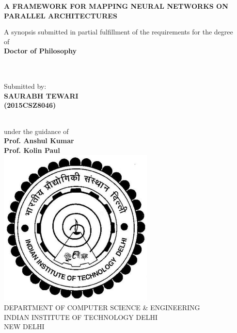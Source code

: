 \documentclass[a4paper,10pt]{article}
\begin{document}
	
\begin{titlepage}
	
	\begin{center}
		
		\vspace{4cm}
		\LARGE \textbf{A FRAMEWORK FOR MAPPING NEURAL NETWORKS ON PARALLEL ARCHITECTURES}\\
		
		\vspace{2cm}
		
		\large {A synopsis submitted in partial fulfillment of the requirements for the degree\ \\}
		\vspace{0.5cm}
		\large {of\ \\}
		\vspace{0.5cm}
		\Large \textbf{Doctor of Philosophy \ \\}
		\vspace{0.5cm}
		
		\large \ \\ \ \\ Submitted by: \ \\
		\Large \textbf{SAURABH TEWARI \ \\ (2015CSZ8046)} 
		
		\large {\ \\ under the guidance of \ \\}
		\large \textbf{ Prof. Anshul Kumar\\ }
		\large \textbf{ Prof. Kolin Paul\\ }
		\vspace{2.0cm}
		\hspace{0cm}
		\includegraphics[scale=1.0]{images/logo.pdf} \\
		\vspace{2.0cm} 
		\Large {DEPARTMENT OF COMPUTER SCIENCE \& ENGINEERING}\\
		\Large {INDIAN INSTITUTE OF TECHNOLOGY DELHI \\ NEW DELHI}\\
	\end{center}
	
\end{titlepage}

\newpage
\setcounter{tocdepth}{2}
\tableofcontents
\newpage
\end{document}
